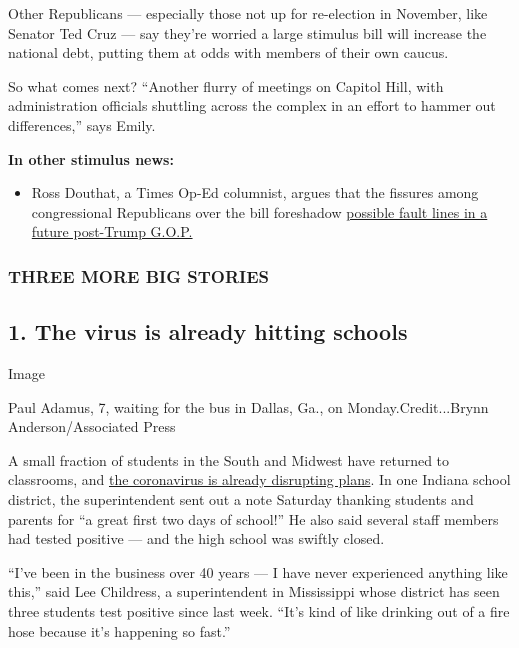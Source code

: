 Other Republicans --- especially those not up for re-election in
November, like Senator Ted Cruz --- say they're worried a large stimulus
bill will increase the national debt, putting them at odds with members
of their own caucus.

So what comes next? ``Another flurry of meetings on Capitol Hill, with
administration officials shuttling across the complex in an effort to
hammer out differences,'' says Emily.

\textbf{In other stimulus news:}

\begin{itemize}
\tightlist
\item
  Ross Douthat, a Times Op-Ed columnist, argues that the fissures among
  congressional Republicans over the bill foreshadow
  \href{https://www.nytimes.com/2020/08/04/opinion/trump-republicans-tea-party.html}{possible
  fault lines in a future post-Trump G.O.P.}
\end{itemize}

\hypertarget{three-more-big-stories}{%
\subsubsection{\texorpdfstring{\textbf{THREE MORE BIG
STORIES}}{THREE MORE BIG STORIES}}\label{three-more-big-stories}}

\hypertarget{1-the-virus-is-already-hitting-schools}{%
\subsection{1. The virus is already hitting
schools}\label{1-the-virus-is-already-hitting-schools}}

Image

Paul Adamus, 7, waiting for the bus in Dallas, Ga., on
Monday.Credit...Brynn Anderson/Associated Press

A small fraction of students in the South and Midwest have returned to
classrooms, and
\href{https://www.nytimes.com/2020/08/03/us/school-closing-coronavirus.html}{the
coronavirus is already disrupting plans}. In one Indiana school
district, the superintendent sent out a note Saturday thanking students
and parents for ``a great first two days of school!'' He also said
several staff members had tested positive --- and the high school was
swiftly closed.

``I've been in the business over 40 years --- I have never experienced
anything like this,'' said Lee Childress, a superintendent in
Mississippi whose district has seen three students test positive since
last week. ``It's kind of like drinking out of a fire hose because it's
happening so fast.''

